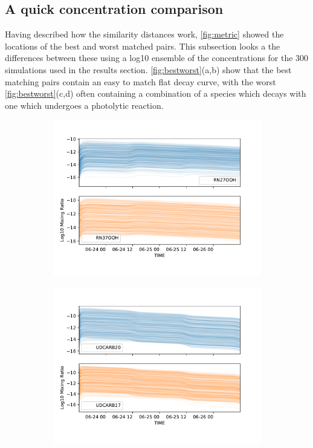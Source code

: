   \subsection{A quick concentration comparison}
  Having described how the similarity distances work, \autoref{fig:metric} showed the locations of the best and worst matched pairs. This subsection looks a the differences between these using a log10 ensemble of the concentrations for the 300 simulations used in the results section. \autoref{fig:bestworst}(a,b) show that the best matching pairs contain an easy to match flat decay curve, with the worst \autoref{fig:bestworst}(c,d) often containing a combination of a species which decays with one which undergoes a photolytic reaction.


  \begin{figure}[H]
  \begin{subfigure}[t]{.5\textwidth}
    \centering
    \includegraphics[width=\textwidth]{ensemble/RN27OOH-RN37OOH.pdf}
    \caption{}
  \end{subfigure}%
  \begin{subfigure}[t]{.5\textwidth}
    \centering
    \includegraphics[width=\textwidth]{ensemble/UDCARB20-UDCARB17.pdf}
    \caption{}
  \end{subfigure}%


\end{figure}
